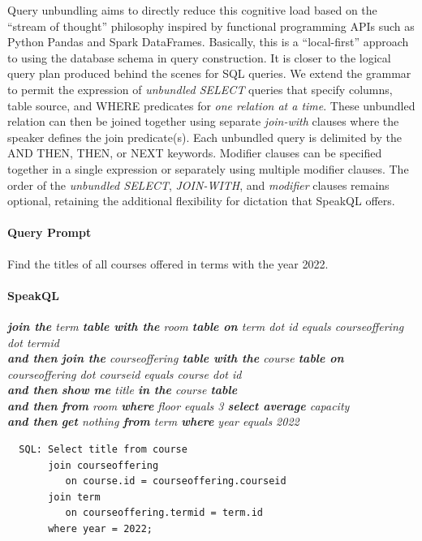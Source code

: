 Query unbundling aims to directly reduce this cognitive load based on the ``stream of thought'' philosophy inspired by functional programming APIs such as Python Pandas and Spark DataFrames.
Basically, this is a ``local-first'' approach to using the database schema in query construction. 
It is closer to the logical query plan produced behind the scenes for SQL queries. 
We extend the grammar to permit the expression of \emph{unbundled SELECT} queries that specify columns, table source, and WHERE predicates for \textit{one relation at a time}. 
These unbundled relation can then be joined together using separate \emph{join-with} clauses where the speaker defines the join predicate(s). 
Each unbundled query is delimited by the AND THEN, THEN, or NEXT keywords.
Modifier clauses can be specified together in a single expression or separately using multiple modifier clauses. 
The order of the \emph{unbundled SELECT}, \emph{JOIN-WITH}, and \emph{modifier} clauses remains optional, retaining the additional flexibility for dictation that SpeakQL offers.

\paragraph{Query Prompt} Find the titles of all courses offered in terms with the year 2022. 

\paragraph{SpeakQL} 
\emph{
  \textbf{join the} term \textbf{table with the} room \textbf{table on} term dot id equals courseoffering dot termid \\
  \textbf{and then}
  \textbf{join the} courseoffering \textbf{table with the} course \textbf{table on} courseoffering dot courseid equals course dot id \\
  \textbf{and then}
  \textbf{show me} title \textbf{in the} course \textbf{table} \\
  \textbf{and then}
  \textbf{from} room \textbf{where} floor equals 3 \textbf{select average} capacity \\
  \textbf{and then}
  \textbf{get} nothing \textbf{from} term \textbf{where} year equals 2022
}
\begin{verbatim}
  SQL: Select title from course
       join courseoffering 
          on course.id = courseoffering.courseid
       join term 
          on courseoffering.termid = term.id
       where year = 2022;
\end{verbatim}


